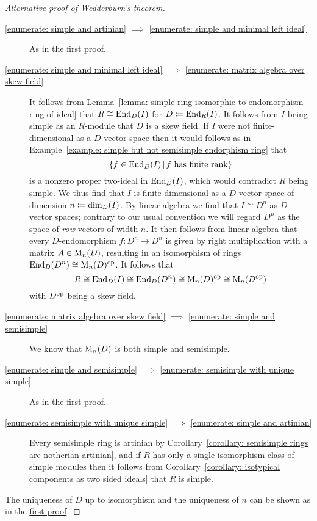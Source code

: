 \begin{proof}[Alternative proof of {\hyperref[theorem: wedderburns theorem]{Wedderburn’s theorem}}]
  \leavevmode
  \begin{description}
    \item[\ref*{enumerate: simple and artinian} $\implies$ \ref*{enumerate: simple and minimal left ideal}]
      As in the \hyperref[proof: wedderburns theorem first proof]{first proof}.
    \item[\ref*{enumerate: simple and minimal left ideal} $\implies$ \ref*{enumerate: matrix algebra over skew field}]
      It follows from Lemma~\ref{lemma: simple ring isomorphic to endomorphism ring of ideal} that $R \cong \operatorname{End}_D(I)$ for $D \coloneqq \operatorname{End}_R(I)$.
      It follows from $I$ being simple as an $R$-module that $D$ is a skew field.
      If $I$ were not finite-dimensional as a $D$-vector space then it would follows as in Example~\ref{example: simple but not semisimple endorphism ring} that
      \[
        \{
          f \in \End_D(I)
        \suchthat
          \text{$f$ has finite rank}
        \}
      \]
      is a nonzero proper two-ideal in $\operatorname{End}_D(I)$, which would contradict $R$ being simple.
      We thus find that $I$ is finite-dimensional as a $D$-vector space of dimension $n \coloneqq \dim_D(I)$.
      By linear algebra we find that $I \cong D^n$ as $D$-vector spaces;
      contrary to our usual convention we will regard $D^n$ as the space of \emph{row} vectors of width $n$.
      It then follows from linear algebra that every $D$-endomorphism $f \colon D^n \to D^n$ is given by right multiplication with a matrix $A \in \operatorname{M}_n(D)$, resulting in an isomorphism of rings $\operatorname{End}_D(D^n) \cong \operatorname{M}_n(D)^{\operatorname{op}}$.
      It follows that
      \[
              R
        \cong \operatorname{End}_D(I)
        \cong \operatorname{End}_D(D^n)
        \cong \operatorname{M}_n(D)^{\operatorname{op}}
        \cong \operatorname{M}_n(D^{\operatorname{op}})
      \]
      with $D^{\operatorname{op}}$ being a skew field.
    \item[\ref*{enumerate: matrix algebra over skew field} $\implies$ \ref*{enumerate: simple and semisimple}]
      We know that $\operatorname{M}_n(D)$ is both simple and semisimple.
    \item[\ref*{enumerate: simple and semisimple} $\implies$ \ref*{enumerate: semisimple with unique simple}]
      As in the \hyperref[proof: wedderburns theorem first proof]{first proof}.
    \item[\ref*{enumerate: semisimple with unique simple} $\implies$ \ref*{enumerate: simple and artinian}]
      Every semisimple ring is artinian by Corollary~\ref{corollary: semisimple rings are notherian artinian}, and if $R$ has only a single isomorphism class of simple modules then it follows from Corollary~\ref{corollary: isotypical components as two sided ideals} that $R$ is simple.
  \end{description}
  The uniqueness of $D$ up to isomorphism and the uniqueness of $n$ can be shown as in the \hyperref[proof: wedderburns theorem first proof]{first proof}.
\end{proof}


